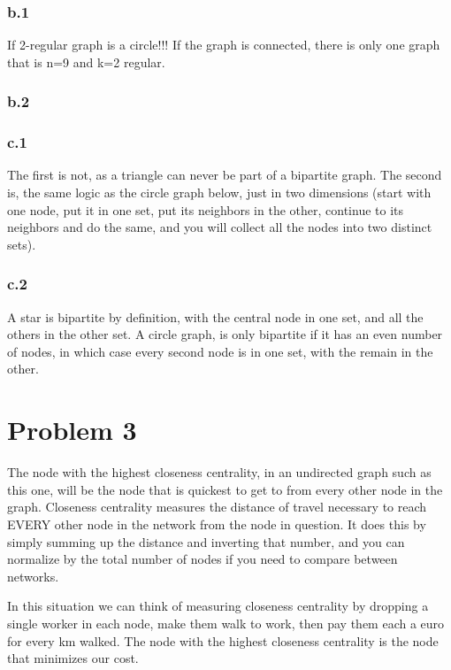 \documentclass[a4paper,12pt]{article}
\begin{document}
\subsubsection*{b.1}
If 2-regular graph is a circle!!! If the graph is connected, there is only one graph that is n=9 and k=2 regular.

\subsubsection*{b.2}


\subsubsection*{c.1}
The first is not, as a triangle can never be part of a bipartite graph. The second is, the same logic as the circle graph below, just in two dimensions (start with one node, put it in one set, put its neighbors in the other, continue to its neighbors and do the same, and you will collect all the nodes into two distinct sets).

\subsubsection*{c.2}
A star is bipartite by definition, with the central node in one set, and all the others in the other set. A circle graph, is only bipartite if it has an even number of nodes, in which case every second node is in one set, with the remain in the other.



\section*{Problem 3}
The node with the highest closeness centrality, in an undirected graph such as this one, will be the node that is quickest to get to from every other node in the graph. Closeness centrality measures the distance of travel necessary to reach EVERY other node in the network from the node in question. It does this by simply summing up the distance and inverting that number, and you can normalize by the total number of nodes if you need to compare between networks.

In this situation we can think of measuring closeness centrality by dropping a single worker in each node, make them walk to work, then pay them each a euro for every km walked. The node with the highest closeness centrality is the node that minimizes our cost.
\end{document}
